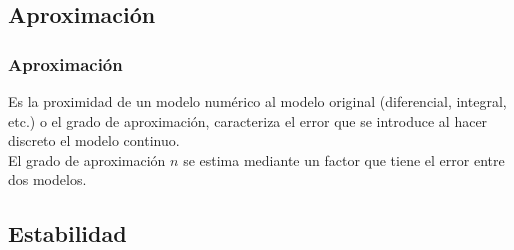 \documentclass[12pt]{beamer}
\begin{document}

\subsection{Aproximación}

\begin{frame}
\frametitle{Aproximación}
Es la proximidad de un modelo numérico al modelo original (diferencial, integral, etc.) o el
grado de aproximación, caracteriza el error que se introduce al hacer discreto el modelo
continuo.
\\
\bigskip
\pause
El grado de aproximación $n$ se estima mediante un factor que tiene el error entre dos modelos.
\end{frame}

\subsection{Estabilidad}
\end{document}
